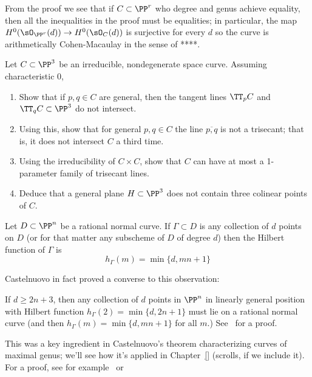 From the proof we see that if  $C\subset \PP^r$ who degree and genus achieve equality, then all the inequalities in the proof
must be equalities; in particular, the map $H^0(\sO_{\PP^r}(d)) \to H^0(\sO_C(d))$ is surjective for every $d$ so the curve is
arithmetically Cohen-Macaulay in the sense of ****. 

\begin{exercise}\label{weak general position}
Let $C \subset \PP^3$ be an irreducible, nondegenerate space curve. Assuming characteristic 0,
\begin{enumerate}
\item Show that if $p, q \in C$ are general, then the tangent lines $\TT_pC$ and $\TT_qC \subset \PP^3$ do not intersect.
\item Using this, show that for general $p, q \in C$ the line $\overline{p,q}$ is not a trisecant; that is, it does not intersect $C$ a third time.
\item Using the irreducibility of $C \times C$, show that $C$ can have at most a 1-parameter family of trisecant lines.
\item Deduce that a general plane $H \subset \PP^3$ does not contain three colinear points of $C$.
\end{enumerate}
\end{exercise}

\begin{exercise}\label{linear bound is sharp}
Let $D \subset \PP^n$ be a rational normal curve. If $\Gamma \subset D$ is any collection of $d$ points on $D$ (or for that matter any subscheme of $D$ of degree $d$) then the Hilbert function of $\Gamma$ is
$$
h_\Gamma(m) = \min\{d, mn+1\}
$$
\end{exercise} 

Castelnuovo in fact proved a converse to this observation:

\begin{fact}
If $d \geq 2n+3$, then any collection of $d$ points in $\PP^n$ in linearly general position with Hilbert function $h_\Gamma(2) = \min\{d, 2n+1\}$ must lie on a rational normal curve (and then $h_\Gamma(m) = \min\{d, mn+1\}$ for all $m$.) See~\cite{****} for a proof.
\end{fact}

This was a key ingredient in Castelnuovo's theorem characterizing curves of maximal genus; we'll see how it's applied in Chapter~\ref{} (scrolls, if we include it). For a proof, see for example~\cite{ACGH} or~\cite{Montreal}

